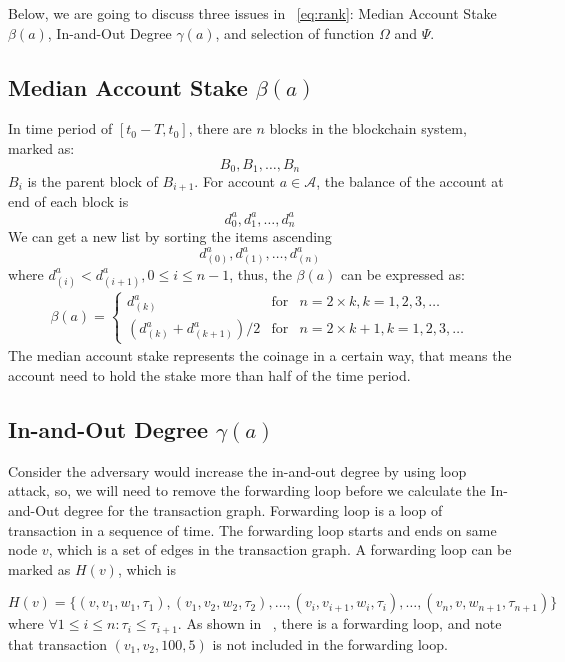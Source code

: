 Below, we are going to discuss three issues in ~\ref{eq:rank}: Median Account Stake $\beta(a)$, In-and-Out Degree $\gamma(a)$, and selection of function $\Omega$ and $\Psi$.

\subsection{Median Account Stake $\beta(a)$}
In time period of $[t_0-T, t_0]$, there are $n$ blocks in the blockchain system, marked as:
\[
B_0, B_1, \dots, B_n
\]
\noindent $B_{i}$ is the parent block of $B_{i+1}$. For account $a \in \mathcal{A}$, the balance of the account at end of each block is
\[
d^a_0, d^a_1, \dots, d^a_n
\]
We can get a new list by sorting the items ascending 
\[
d^a_{(0)}, d^a_{(1)}, \dots, d^a_{(n)}
\]
where $d^a_{(i)} < d^a_{(i+1)}, 0\le i \le {n-1}$, thus, the $\beta(a)$ can be expressed as:
\begin{align}
\beta(a) = \left\{ \begin{array}{rcl}
{d^a_{(k)}} & \mbox{for} & n=2\times{}k, k=1, 2, 3, \ldots \\
{(d^a_{(k)} + d^a_{(k+1)})/2} & \mbox{for} & n=2\times{}k + 1, k=1, 2, 3, \ldots
\end{array}\right.
\end{align}
The median account stake represents the coinage in a certain way, that means the account need to hold the stake more than half of the time period.

\subsection{In-and-Out Degree $\gamma(a)$}
Consider the adversary would increase the in-and-out degree by using loop attack, so, we will need to remove the forwarding loop before we calculate the In-and-Out degree for the transaction graph. Forwarding loop is a loop of transaction in a sequence of time.
The forwarding loop starts and ends on same node $v$, which is a set of edges in the transaction graph. A forwarding loop can be marked as $H(v)$, which is

\[
H(v) = \{(v, v_1, w_1, \tau_1), (v_1, v_2, w_2, \tau_2), \dots, (v_i, v_{i+1}, w_{i}, \tau_i), \dots, (v_n, v, w_{n+1}, \tau_{n+1})\}
\]
\noindent where $\forall 1\le i \le n : \tau_i \le \tau_{i+1} $.
\noindent As shown in ~, there is a forwarding loop, and note that transaction $(v_1, v_2, 100, 5)$ is not included in the forwarding loop.




